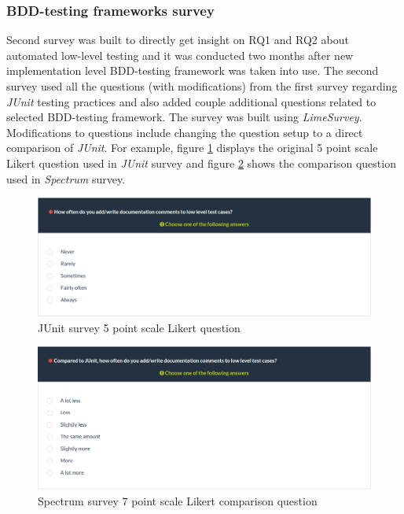     \subsubsection{BDD-testing frameworks survey}
    Second survey was built to directly get insight on RQ1 and RQ2 about automated low-level testing
    and it was conducted two months after new implementation level BDD-testing framework was taken into use.
    The second survey used all the questions (with modifications) from the first survey regarding \textit{JUnit} testing practices and
    also added couple additional questions related to selected BDD-testing framework. The survey was built using \textit{LimeSurvey}.
    Modifications to questions include changing the question setup to a direct comparison of \textit{JUnit}.
    For example, figure \ref{fig:survey-junit-comments} displays the original 5 point scale Likert question used in \textit{JUnit} survey and
    figure \ref{fig:survey-bdd-comments} shows the comparison question used in \textit{Spectrum} survey.
    \begin{figure}[H]
      \begin{center}
        \includegraphics[width=13.7cm]{images/survey-org-comments.png}
        \caption{JUnit survey 5 point scale Likert question}
        \label{fig:survey-junit-comments}
      \end{center}
    \end{figure}
    \begin{addmargin}[0em]{0em}
    \end{addmargin}
    \begin{figure}[ht]
      \begin{center}
        \includegraphics[width=13.7cm]{images/survey-bdd-comments.png}
        \caption{Spectrum survey 7 point scale Likert comparison question}
        \label{fig:survey-bdd-comments}
      \end{center}
    \end{figure}

